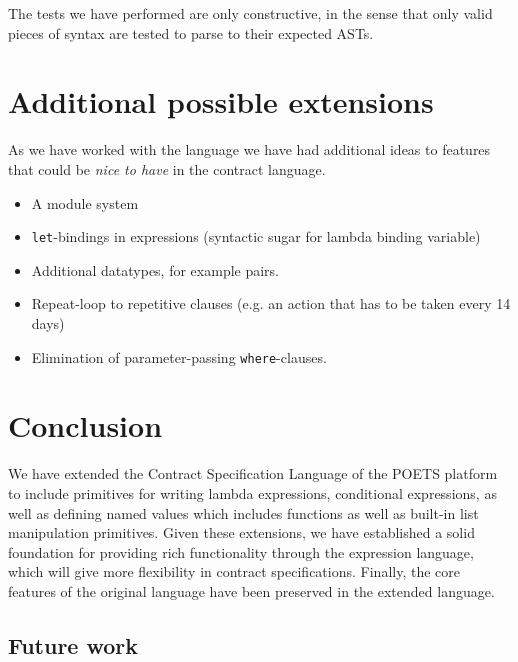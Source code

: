 \documentclass[10pt,a4paper,final,oneside,openany,article]{memoir}
\begin{document}
The tests we have performed are only constructive, in the sense that
only valid pieces of syntax are tested to parse to their expected
ASTs.

\chapter{Additional possible extensions} As we have worked with the
language we have had additional ideas to features that could be
\textit{nice to have} in the contract language.

\begin{itemize}
\item A module system
\item \lstinline{let}-bindings in expressions (syntactic sugar for
  lambda binding variable)
\item Additional datatypes, for example pairs.
\item Repeat-loop to repetitive clauses (e.g. an action that has to be
  taken every 14 days)
\item Elimination of parameter-passing \lstinline{where}-clauses.
\end{itemize}

\chapter{Conclusion}
We have extended the Contract Specification Language of the POETS
platform to include primitives for writing lambda expressions,
conditional expressions, as well as defining named values which includes
functions as well as built-in list manipulation primitives. Given these
extensions, we have established a solid foundation for providing rich
functionality through the expression language, which will give more
flexibility in contract specifications.
Finally, the core features of the original language have been preserved
in the extended language.


\section{Future work}


\printbibliography
\end{document}
